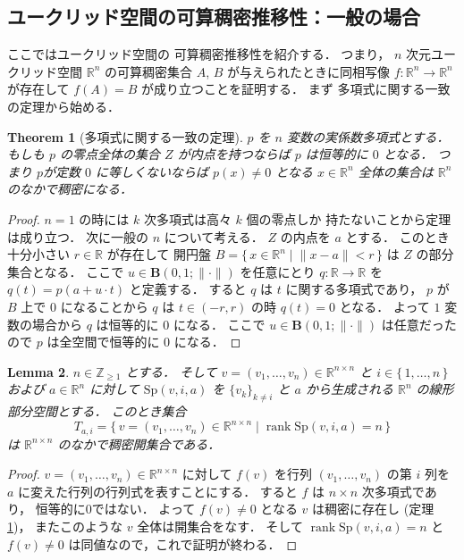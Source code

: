 \documentclass[leqno, a4paper, 12pt]{jsarticle}
\theoremstyle{plain}
\newtheorem{thm}{Theorem}[section]
\newtheorem{lem}[thm]{Lemma}
\theoremstyle{definition}
\theoremstyle{remark}
\newcommand{\zz}{\mathbb{Z}}
\newcommand{\rr}{\mathbb{R}}
\DeclareMathOperator{\rank}{rank}
\newcommand{\yospsp}[1]{\mathrm{Sp}(#1)}
\newcommand{\yoballfont}{\mathbf}
\newcommand{\yometcball}[3]{\yoballfont{B}(#1, #2; #3)}
\numberwithin{equation}{section}
\begin{document}
\subsection{ユークリッド空間の可算稠密推移性：一般の場合}\label{subsec:cdh}

ここではユークリッド空間の
可算稠密推移性を紹介する．
つまり，
$n$
次元ユークリッド空間
$\rr^{n}$
の可算稠密集合
$A$, 
$B$
が与えられたときに同相写像
$f\colon  \rr^{n}\to \rr^{n}$
が存在して
$f(A)=B$
が成り立つことを証明する．
まず
多項式に関する一致の定理から始める．

\begin{thm}[多項式に関する一致の定理]\label{thm:sumpolynomialicchi}
$p$
を
$n$
変数の実係数多項式とする．
もしも
$p$
の零点全体の集合
$Z$
が内点を持つならば
$p$
は恒等的に
$0$
となる．
つまり
$p$が定数
$0$
に等しくないならば
$p(x)\neq 0$
となる
$x\in \rr^{n}$
全体の集合は
$\rr^{n}$
のなかで稠密になる．
\end{thm}
\begin{proof}
$n=1$
の時には
$k$
次多項式は高々
$k$
個の零点しか
持たないことから定理は成り立つ．
次に一般の
$n$
について考える．
$Z$
の内点を
$a$
とする．
このとき十分小さい
$r\in \rr$
が存在して
開円盤
$B=
\{\, x\in \rr^{n}
\mid 
\lVert x-a\rVert<r
\, \}$
は
$Z$
の部分集合となる．
ここで
$u\in \yometcball{0}{1}{\lVert\cdot \rVert}$
を任意にとり
$q\colon \rr\to \rr$
を
$q(t)=p(a+u\cdot t)$
と定義する．
すると
$q$
は
$t$
に関する多項式であり，
$p$
が
$B$
上で
$0$
になることから
$q$
は
$t\in (-r, r)$
の時
$q(t)=0$
となる．
よって
$1$
変数の場合から
$q$
は恒等的に
$0$
になる．
ここで
$u\in \yometcball{0}{1}{\lVert\cdot \rVert}$
は任意だったので
$p$
は全空間で恒等的に
$0$
になる．
\end{proof}



\begin{lem}\label{lem:sum:openrankdense}
$n\in \zz_{\ge 1}$
とする．
そして
$v=(v_{1}, \dots, v_{n})\in \rr^{n\times n}$
と
$i\in \{\, 
1, \dots, n
\, \}$
および
$a\in \rr^{n}$
に対して
$\yospsp{v, i, a}$
を
$\{v_{k}\}_{k\neq i}$
と
$a$
から生成される
$\rr^{n}$
の線形部分空間とする．
このとき集合
\[
T_{a, i}=
\{\, v=(v_1, \dots, v_n)\in \rr^{n\times n}\mid
\rank \yospsp{v, i, a}=n
\, \}
\]
は
$\rr^{n\times n}$
のなかで稠密開集合である．
\end{lem}
\begin{proof}
$v=(v_{1}, \dots, v_{n})\in \rr^{n\times n}$
に対して
$f(v)$
を行列
$(v_{1}, \dots, v_{n})$
の第
$i$
列を
$a$
に変えた行列の行列式を表すことにする．
すると
$f$
は
$n\times n$
次多項式であり，
恒等的に$0$ではない．
よって
$f(v)\neq 0$
となる
$v$
は稠密に存在し
(定理
\ref{thm:sumpolynomialicchi})，
またこのような
$v$
全体は開集合をなす．
そして
$\rank \yospsp{v, i, a}=n$
と
$f(v)\neq 0$
は同値なので，これで証明が終わる．
\end{proof}
\end{document}
